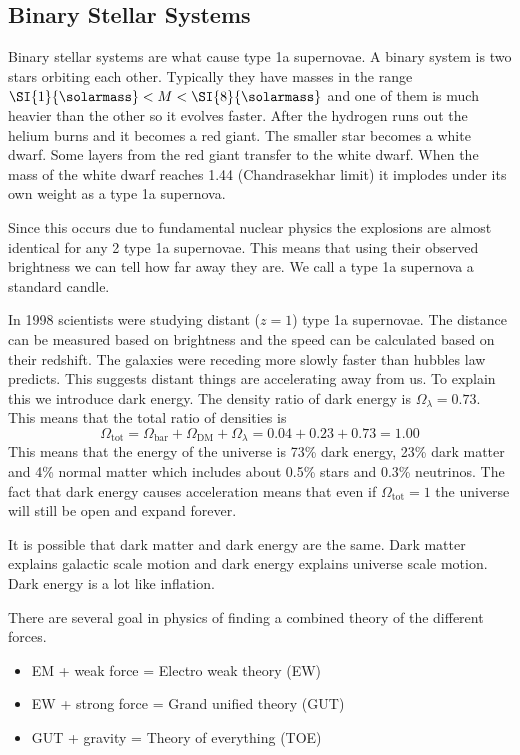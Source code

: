 \subsection*{Binary Stellar Systems}

Binary stellar systems are what cause type 1a supernovae. A binary system is two stars orbiting each other. Typically they have masses in the range \(\SI{1}{\solarmass}<M<\SI{8}{\solarmass}\) and one of them is much heavier than the other so it evolves faster. After the hydrogen runs out the helium burns and it becomes a red giant. The smaller star becomes a white dwarf. Some layers from the red giant transfer to the white dwarf. When the mass of the white dwarf reaches \SI{1.44}{\solarmass} (Chandrasekhar limit) it implodes under its own weight as a type 1a supernova.

Since this occurs due to fundamental nuclear physics the explosions are almost identical for any 2 type 1a supernovae. This means that using their observed brightness we can tell how far away they are. We call a type 1a supernova a standard candle.

In 1998 scientists were studying distant (\(z=1\)) type 1a supernovae. The distance can be measured based on brightness and the speed can be calculated based on their redshift. The galaxies were receding more slowly faster than hubbles law predicts. This suggests distant things are accelerating away from us. To explain this we introduce dark energy. The density ratio of dark energy is \(\Omega_\lambda=0.73\). This means that the total ratio of densities is
\[\Omega_\mathrm{tot}=\Omega_\mathrm{bar}+\Omega_\mathrm{DM}+\Omega_\lambda=0.04+0.23+0.73=1.00\]
This means that the energy of the universe is 73\% dark energy, 23\% dark matter and 4\% normal matter which includes about 0.5\% stars and 0.3\% neutrinos. The fact that dark energy causes acceleration means that even if \(\Omega_\mathrm{tot}=1\) the universe will still be open and expand forever.

It is possible that dark matter and dark energy are the same. Dark matter explains galactic scale motion and dark energy explains universe scale motion. Dark energy is a lot like inflation.

There are several goal in physics of finding a combined theory of the different forces.
\begin{itemize}
\item EM + weak force = Electro weak theory (EW)
\item EW + strong force = Grand unified theory (GUT)
\item GUT + gravity = Theory of everything (TOE)
\end{itemize}
